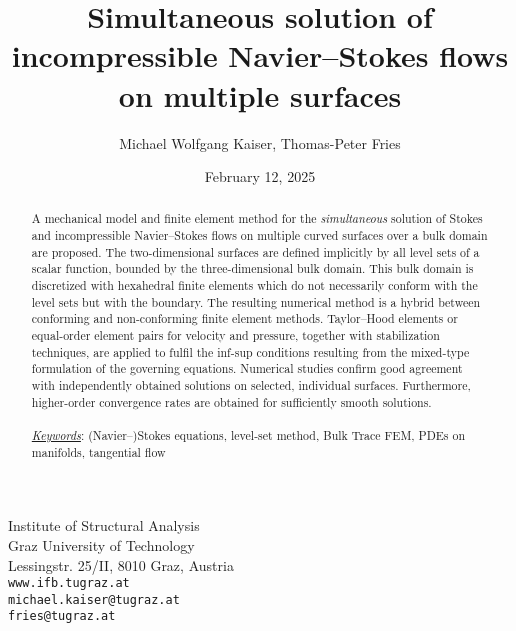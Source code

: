 \documentclass[12pt, twoside, english]{article}
\newcommand{\lyxaddress}[1]{
\par {\raggedright #1
\vspace{1.4em}
\noindent\par}
}
\numberwithin{equation}{section}
\begin{document}
\title{Simultaneous solution of incompressible Navier--Stokes flows on multiple surfaces}

\author{Michael Wolfgang Kaiser, Thomas-Peter Fries}
\date{February 12, 2025}
\maketitle



\lyxaddress{\begin{center}
Institute of Structural Analysis\\
Graz University of Technology\\
Lessingstr. 25/II, 8010 Graz, Austria\\
\texttt{www.ifb.tugraz.at}\\
\texttt{michael.kaiser@tugraz.at}\\
\texttt{fries@tugraz.at}
\end{center}}

\begin{abstract}
A mechanical model and finite element method for the \emph{simultaneous} solution of Stokes and incompressible Navier--Stokes flows on multiple curved surfaces over a bulk domain are proposed. The two-dimensional surfaces are defined implicitly by all level sets of a scalar function, bounded by the three-dimensional bulk domain. This bulk domain is discretized with hexahedral finite elements which do not necessarily conform with the level sets but with the boundary. The resulting numerical method is a hybrid between conforming and non-conforming finite element methods. Taylor--Hood elements or equal-order element pairs for velocity and pressure, together with stabilization techniques, are applied to fulfil the inf-sup conditions resulting from the mixed-type formulation of the governing equations. Numerical studies confirm good agreement with independently obtained solutions on selected, individual surfaces. Furthermore, higher-order convergence rates are obtained for sufficiently smooth solutions.\\
\\
\underline{\emph{Keywords}}: (Navier--)Stokes equations, level-set method, Bulk Trace FEM, PDEs on manifolds, tangential flow
\end{abstract}
\tableofcontents{}\newpage{}

\end{document}

